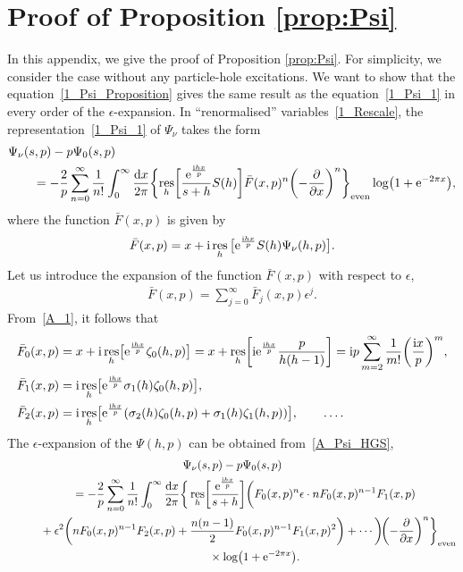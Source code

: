 \documentclass[pdftex]{sigma}
\numberwithin{equation}{section}
\DeclareMathOperator{\res}{res}
\begin{document}
\section{Proof of Proposition \ref{prop:Psi}}\label{appendix:PsiProof}
In this appendix, we give the proof of Proposition \ref{prop:Psi}. For simplicity, we consider the case without any particle-hole excitations. We want to show that the equation~\eqref{1_Psi_Proposition} gives the same result as the equation~\eqref{1_Psi_1} in every order of the $\epsilon$-expansion. In ``renormalised'' variables~\eqref{1_Rescale}, the representation~\eqref{1_Psi_1} of $\Psi_\nu$ takes the form
\begin{align}
&\Psi_\nu(s, p)-p\Psi_0(s, p) \nonumber\\
&\qquad{}=-\frac{2}{p} \sum_{n=0}^{\infty} \frac{1}{n!} \int_{0}^{\infty} \frac{{\rm d}x}{2\pi}
        \biggl\{\res_h\biggl[ \frac{{\rm e}^{\frac{{\rm i}hx}{p}}}{s+h} S(h) \biggr] \bar{F}(x, p)^n \biggl(-\frac{\partial}{\partial x}\biggr)^n \biggr\}_{\text{even}}\log\bigl(1+{\rm e}^{-2\pi x}\bigr),\label{A_Psi_HGS}
\end{align}
where the function $\bar{F}(x, p)$ is given by
\begin{align}\label{A_1}
\bar{F}(x, p)=x+{\rm i}\res_h\big[ {\rm e}^{\frac{{\rm i}hx}{p}} S(h)\Psi_\nu(h, p) \big].
\end{align}
Let us introduce the expansion of the function $\bar{F}(x, p)$ with respect to $\epsilon$,
\begin{align*}
\bar{F}(x, p)=\sum_{j=0}^{\infty} \bar{F}_j(x, p) \epsilon^j.
\end{align*}
From~\eqref{A_1}, it follows that
\begin{align}
&\bar{F}_0(x, p)=x+{\rm i}\res_h\bigl[ {\rm e}^{\frac{{\rm i}hx}{p}} \zeta_0(h, p) \bigr] = x+\res_h\biggl[ {\rm i} {\rm e}^{\frac{{\rm i}hx}{p}} \frac{p}{h(h-1)} \biggr] = {\rm i}p \sum_{m=2}^{\infty} \frac{1}{m!} \biggl(\frac{{\rm i}x}{p}\biggr)^m, \nonumber\\
&\bar{F}_1(x, p)={\rm i}\res_h\bigl[ {\rm e}^{\frac{{\rm i}hx}{p}} \sigma_1(h)\zeta_0(h, p) \bigr], \cr
&\bar{F}_2(x, p)={\rm i}\res_h\bigl[ {\rm e}^{\frac{{\rm i}hx}{p}} (\sigma_2(h)\zeta_0(h, p) + \sigma_1(h)\zeta_1(h, p)) \bigr], \qquad \dots.
\label{A_F_Epsilon}
\end{align}
The $\epsilon$-expansion of the $\Psi(h, p)$ can be obtained from~\eqref{A_Psi_HGS},
\begin{gather}
\Psi_\nu(s, p)-p\Psi_0(s, p)\nonumber\\
\qquad{}=-\frac{2}{p} \sum_{n=0}^{\infty} \frac{1}{n!} \int_{0}^{\infty} \frac{{\rm d}x}{2\pi}
        \bigg\{ \res_h\biggl[ \frac{{\rm e}^{\frac{{\rm i}hx}{p}}}{s+h} \biggr]
        \bigg(F_0(x, p)^n
              \epsilon\cdot nF_0(x, p)^{n-1}F_1(x, p)  \cr
\qquad\hphantom{=}{} +\epsilon^2 \biggl(nF_0(x, p)^{n-1}F_2(x, p) + \frac{n(n-1)}{2}F_0(x, p)^{n-1}F_1(x, p)^2\biggr) + \cdots \bigg) \! \biggl(-\frac{\partial}{\partial x}\biggr)^n \bigg\}_{\text{even}} \cr
\qquad\hphantom{=+}{}\times \log\bigl(1+{\rm e}^{-2\pi x}\bigr).\label{A_HGS_Epsilon}
\end{gather}
\end{document}
